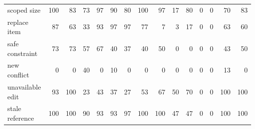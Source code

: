\begin{tabular}{lrrrrrrrrrrrrrr}
scoped size & \cellcolor[gray]{0.65}100 & \cellcolor[gray]{0.71}83 & \cellcolor[gray]{0.74}73 & \cellcolor[gray]{0.66}97 & \cellcolor[gray]{0.69}90 & \cellcolor[gray]{0.72}80 & \cellcolor[gray]{0.65}100 & \cellcolor[gray]{0.66}97 & \cellcolor[gray]{0.94}17 & \cellcolor[gray]{0.72}80 & \cellcolor[gray]{1.00}0 & \cellcolor[gray]{1.00}0 & \cellcolor[gray]{0.76}70 & \cellcolor[gray]{0.71}83 \\
replace item & \cellcolor[gray]{0.70}87 & \cellcolor[gray]{0.78}63 & \cellcolor[gray]{0.88}33 & \cellcolor[gray]{0.67}93 & \cellcolor[gray]{0.66}97 & \cellcolor[gray]{0.66}97 & \cellcolor[gray]{0.73}77 & \cellcolor[gray]{0.98}7 & \cellcolor[gray]{0.99}3 & \cellcolor[gray]{0.94}17 & \cellcolor[gray]{1.00}0 & \cellcolor[gray]{1.00}0 & \cellcolor[gray]{0.78}63 & \cellcolor[gray]{0.79}60 \\
safe constraint & \cellcolor[gray]{0.74}73 & \cellcolor[gray]{0.74}73 & \cellcolor[gray]{0.80}57 & \cellcolor[gray]{0.77}67 & \cellcolor[gray]{0.86}40 & \cellcolor[gray]{0.87}37 & \cellcolor[gray]{0.86}40 & \cellcolor[gray]{0.82}50 & \cellcolor[gray]{1.00}0 & \cellcolor[gray]{1.00}0 & \cellcolor[gray]{1.00}0 & \cellcolor[gray]{1.00}0 & \cellcolor[gray]{0.85}43 & \cellcolor[gray]{0.82}50 \\
new conflict & \cellcolor[gray]{1.00}0 & \cellcolor[gray]{1.00}0 & \cellcolor[gray]{0.86}40 & \cellcolor[gray]{1.00}0 & \cellcolor[gray]{0.96}10 & \cellcolor[gray]{1.00}0 & \cellcolor[gray]{1.00}0 & \cellcolor[gray]{1.00}0 & \cellcolor[gray]{1.00}0 & \cellcolor[gray]{1.00}0 & \cellcolor[gray]{1.00}0 & \cellcolor[gray]{1.00}0 & \cellcolor[gray]{0.95}13 & \cellcolor[gray]{1.00}0 \\
unavailable edit & \cellcolor[gray]{0.67}93 & \cellcolor[gray]{0.65}100 & \cellcolor[gray]{0.92}23 & \cellcolor[gray]{0.85}43 & \cellcolor[gray]{0.87}37 & \cellcolor[gray]{0.91}27 & \cellcolor[gray]{0.81}53 & \cellcolor[gray]{0.77}67 & \cellcolor[gray]{0.82}50 & \cellcolor[gray]{0.76}70 & \cellcolor[gray]{1.00}0 & \cellcolor[gray]{1.00}0 & \cellcolor[gray]{0.65}100 & \cellcolor[gray]{0.65}100 \\
stale reference & \cellcolor[gray]{0.65}100 & \cellcolor[gray]{0.65}100 & \cellcolor[gray]{0.69}90 & \cellcolor[gray]{0.67}93 & \cellcolor[gray]{0.67}93 & \cellcolor[gray]{0.66}97 & \cellcolor[gray]{0.65}100 & \cellcolor[gray]{0.65}100 & \cellcolor[gray]{0.84}47 & \cellcolor[gray]{0.84}47 & \cellcolor[gray]{1.00}0 & \cellcolor[gray]{1.00}0 & \cellcolor[gray]{0.65}100 & \cellcolor[gray]{0.65}100 \\
\bottomrule
\end{tabular}
